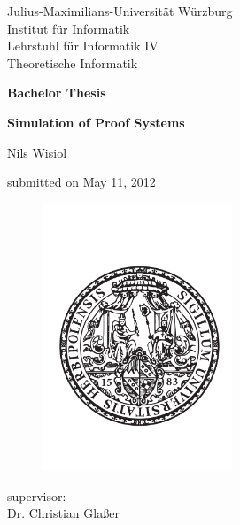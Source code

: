 \begin{titlepage}
  Julius-Maximilians-Universität Würzburg\\
  Institut für Informatik\\
  Lehrstuhl für Informatik IV\\
  Theoretische Informatik
  
  \vspace{3cm}
  
  \begin{center}
   \LARGE\textbf{Bachelor Thesis}
  \end{center}
  
  \vspace{0cm}
  
  \begin{center}
   \huge\textbf{Simulation of Proof Systems}
  \end{center}
  
  \vspace{1cm}
  
  \begin{center}
   \Large Nils Wisiol
  \end{center}
  
  \vspace{0cm}
  
  \begin{center}
   \Large submitted on May 11, 2012
  \end{center}
  
  \begin{figure}[ht]
    \begin{center}
      \includegraphics[height=8cm]{siegel.pdf}  
    \end{center}
  \end{figure}
  
  \begin{center}
   \Large supervisor:\\Dr. Christian Glaßer
  \end{center}
  
  
\end{titlepage}
